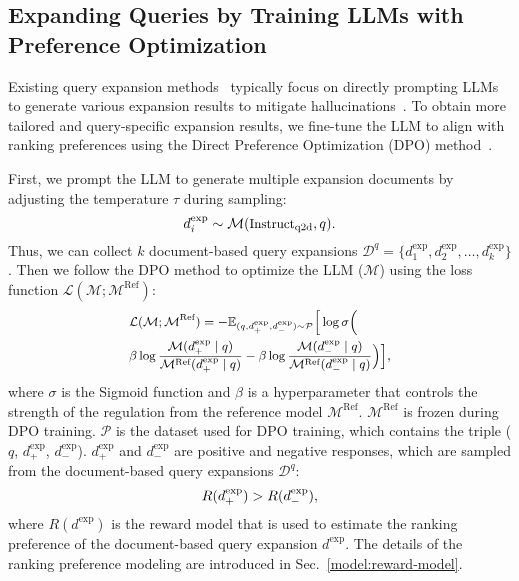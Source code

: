 \subsection{Expanding Queries by Training LLMs with Preference Optimization}\label{model:dpo-training}
Existing query expansion methods~\cite{gao2023precise,li2024can} typically focus on directly prompting LLMs to generate various expansion results to mitigate hallucinations~\cite{brown2020language,thoppilan2022lamda}. To obtain more tailored and query-specific expansion results, we fine-tune the LLM to align with ranking preferences using the Direct Preference Optimization (DPO) method~\cite{amini2024direct}.

First, we prompt the LLM to generate multiple expansion documents by adjusting the temperature $\tau$ during sampling:
\begin{equation}
\small
d^{\text{exp}}_i \sim \mathcal{M}(\text{Instruct}_\text{q2d}, q).
\end{equation}
Thus, we can collect $k$ document-based query expansions $\mathcal{D}^q = \{d^{\text{exp}}_1, d^{\text{exp}}_2, \dots, d^{\text{exp}}_k\}$. 
Then we follow the DPO method to optimize the LLM ($\mathcal{M}$) using the loss function $\mathcal{L}(\mathcal{M}; \mathcal{M}^\text{Ref})$:
\begin{equation}
\small %
\begin{aligned}
\label{eq:dpo}
& \mathcal{L}(\mathcal{M}; \mathcal{M}^\text{Ref}) = 
- \mathbb{E}_{(q, d^{\text{exp}}_+,d^{\text{exp}}_-) \sim \mathcal{P}} \Big[ \log \sigma \Big( \\
& \beta \log \frac{\mathcal{M}(d^{\text{exp}}_+ \mid q)}{\mathcal{M}^\text{Ref}(d^{\text{exp}}_+ \mid q)} - 
\beta \log \frac{\mathcal{M}(d^{\text{exp}}_- \mid q)}{\mathcal{M}^\text{Ref}(d^{\text{exp}}_- \mid q)} \Big) \Big],
\end{aligned}
\end{equation}
where $\sigma$ is the Sigmoid function and $\beta$ is a hyperparameter that controls the strength of the regulation from the reference model $\mathcal{M}^\text{Ref}$. $\mathcal{M}^\text{Ref}$ is frozen during DPO training. $\mathcal{P}$ is the dataset used for DPO training, which contains the triple ($q$, $d^{\text{exp}}_+$, $d^{\text{exp}}_-$). $d^{\text{exp}}_+$ and $d^{\text{exp}}_-$ are positive and negative responses, which are sampled from the document-based query expansions $\mathcal{D}^q$:
\begin{equation}
\small
    R(d^{\text{exp}}_+) > R(d^{\text{exp}}_-),
\end{equation}
where $R(d^{\text{exp}})$ is the reward model that is used to estimate the ranking preference of the document-based query expansion $d^{\text{exp}}$. The details of the ranking preference modeling are introduced in Sec.~\ref{model:reward-model}.

